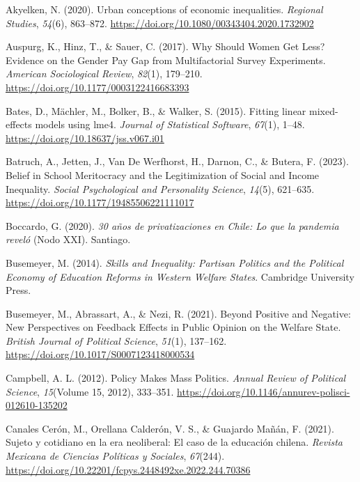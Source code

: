 \documentclass[
  12pt,
]{article}
\newlength{\cslhangindent}
\newenvironment{CSLReferences}[2] %
 {\begin{list}{}{%
  \setlength{\itemindent}{0pt}
  \setlength{\leftmargin}{0pt}
  \setlength{\parsep}{0pt}
  \ifodd #1
   \setlength{\leftmargin}{\cslhangindent}
   \setlength{\itemindent}{-1\cslhangindent}
  \fi
  \setlength{\itemsep}{#2\baselineskip}}}
 {\end{list}}
\begin{document}
\label{refs}
\begin{CSLReferences}{1}{0}
Akyelken, N. (2020). Urban conceptions of economic inequalities.
\emph{Regional Studies}, \emph{54}(6), 863--872.
\url{https://doi.org/10.1080/00343404.2020.1732902}

Auspurg, K., Hinz, T., \& Sauer, C. (2017). Why {Should Women Get Less}?
{Evidence} on the {Gender Pay Gap} from {Multifactorial Survey
Experiments}. \emph{American Sociological Review}, \emph{82}(1),
179--210. \url{https://doi.org/10.1177/0003122416683393}

Bates, D., Mächler, M., Bolker, B., \& Walker, S. (2015). Fitting linear
mixed-effects models using {lme4}. \emph{Journal of Statistical
Software}, \emph{67}(1), 1--48.
\url{https://doi.org/10.18637/jss.v067.i01}

Batruch, A., Jetten, J., Van De Werfhorst, H., Darnon, C., \& Butera, F.
(2023). Belief in {School Meritocracy} and the {Legitimization} of
{Social} and {Income Inequality}. \emph{Social Psychological and
Personality Science}, \emph{14}(5), 621--635.
\url{https://doi.org/10.1177/19485506221111017}

Boccardo, G. (2020). \emph{30 a{ñ}os de privatizaciones en {Chile}: {Lo}
que la pandemia revel{ó}} (Nodo XXI). Santiago.

Busemeyer, M. (2014). \emph{Skills and {Inequality}: {Partisan Politics}
and the {Political Economy} of {Education Reforms} in {Western Welfare
States}}. Cambridge University Press.

Busemeyer, M., Abrassart, A., \& Nezi, R. (2021). Beyond {Positive} and
{Negative}: {New Perspectives} on {Feedback Effects} in {Public Opinion}
on the {Welfare State}. \emph{British Journal of Political Science},
\emph{51}(1), 137--162. \url{https://doi.org/10.1017/S0007123418000534}

Campbell, A. L. (2012). Policy {Makes Mass Politics}. \emph{Annual
Review of Political Science}, \emph{15}(Volume 15, 2012), 333--351.
\url{https://doi.org/10.1146/annurev-polisci-012610-135202}

Canales Cerón, M., Orellana Calderón, V. S., \& Guajardo Mañán, F.
(2021). Sujeto y cotidiano en la era neoliberal: El caso de la
educaci{ó}n chilena. \emph{Revista Mexicana de Ciencias Pol{í}ticas y
Sociales}, \emph{67}(244).
\url{https://doi.org/10.22201/fcpys.2448492xe.2022.244.70386}


\end{CSLReferences}
\end{document}
